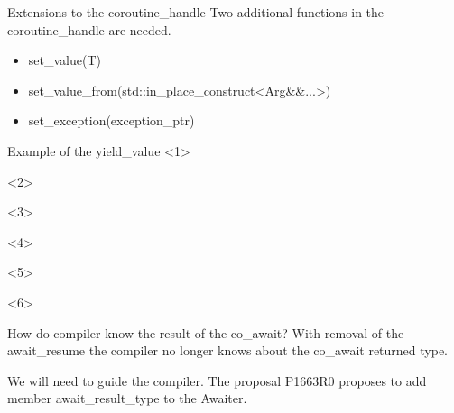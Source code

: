 \documentclass[10pt]{beamer}
\begin{document}
\begin{frame}{Extensions to the coroutine\_handle}
	Two additional functions in the coroutine\_handle are needed.

	\begin{itemize}[<+-| alert@+>]
		\item set\_value(T)
		\item set\_value\_from(std::in\_place\_construct<Arg\&\&...>)
		\item set\_exception(exception\_ptr)
	\end{itemize}
	


\end{frame}

\begin{frame}{Example of the yield\_value}
<1>

<2>

<3>

<4>

<5>

<6>

\end{frame}

\begin{frame}{How do compiler know the result of the co\_await?}
	With removal of the \alert{await\_resume} the compiler no longer knows about the co\_await returned type.
	\vfill

	We will need to guide the compiler. The proposal 
	P1663R0 proposes to add member \alert{await\_result\_type} to the Awaiter.
	\vfill

\end{frame}
\end{document}
